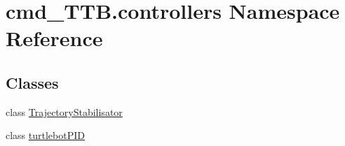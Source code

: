 \hypertarget{namespacecmd__TTB_1_1controllers}{}\section{cmd\+\_\+\+T\+T\+B.\+controllers Namespace Reference}
\label{namespacecmd__TTB_1_1controllers}
\subsection*{Classes}
\begin{DoxyCompactItemize}
\item 
class \hyperlink{classcmd__TTB_1_1controllers_1_1TrajectoryStabilisator}{Trajectory\+Stabilisator}
\item 
class \hyperlink{classcmd__TTB_1_1controllers_1_1turtlebotPID}{turtlebot\+P\+ID}
\end{DoxyCompactItemize}
